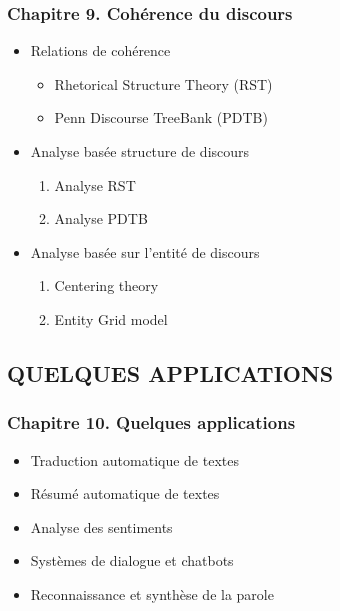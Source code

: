 \documentclass[11pt, a4paper]{article}
\begin{document}
\begin{tcolorbox}
\subsubsection*{Chapitre 9. Cohérence du discours}

\begin{multicols}{2}
	\begin{itemize}
	
		\item Relations de cohérence
		\begin{itemize}
			\item Rhetorical Structure Theory (RST)
			\item Penn Discourse TreeBank (PDTB)
		\end{itemize}
	
		\item Analyse basée structure de discours
		\begin{enumerate}
			\item Analyse RST
			\item Analyse PDTB
		\end{enumerate}
	
		\item Analyse basée sur l'entité de discours
		\begin{enumerate}
			\item Centering theory
			\item Entity Grid model
		\end{enumerate}
		
	\end{itemize}
\end{multicols}
\end{tcolorbox}

\subsection*{\uppercase{Quelques applications}}

\begin{tcolorbox}
\subsubsection*{Chapitre 10. Quelques applications}

\begin{multicols}{2}
	\begin{itemize}	
		\item Traduction automatique de textes
		\item Résumé automatique de textes
		\item Analyse des sentiments
		\item Systèmes de dialogue et chatbots
		\item Reconnaissance et synthèse de la parole
	\end{itemize}
\end{multicols}
\end{tcolorbox}
\end{document}
